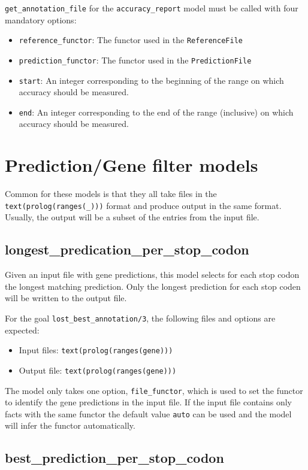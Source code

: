 \documentclass{book}
\begin{document}
\texttt{get\_annotation\_file} for the \texttt{accuracy\_report} model
must be called with four mandatory options:
\begin{itemize}
\item \texttt{reference\_functor}: The functor used in the \texttt{ReferenceFile}
\item \texttt{prediction\_functor}: The functor used in the
  \texttt{PredictionFile}
\item \texttt{start}: An integer corresponding to the beginning of the range on which accuracy
  should be measured.
\item \texttt{end}: An integer corresponding to the end of the range
  (inclusive) on which accuracy should be measured.
\end{itemize}

\section{Prediction/Gene filter models}

Common for these models is that they all take files in the
\texttt{text(prolog(ranges(\_)))} format and produce output in 
the same format. Usually, the output will be a subset of the entries
from the input file.

\subsection{longest\_predication\_per\_stop\_codon}

Given an input file with gene predictions, this model selects for each
stop codon the longest matching prediction. Only the longest
prediction for each stop coden will be written to the output file.

For the goal \texttt{lost\_best\_annotation/3}, the following files
and options are expected:
\begin{itemize}
\item Input files: \texttt{text(prolog(ranges(gene)))}
\item Output file: \texttt{text(prolog(ranges(gene)))}
\end{itemize}

The model only takes one option, \texttt{file\_functor}, which is 
used to set the functor to identify the gene predictions in the input
file. If the input file contains only facts with the same functor the 
default value \texttt{auto} can be used and the model will infer the 
functor automatically.

\subsection{best\_prediction\_per\_stop\_codon}
\end{document}
